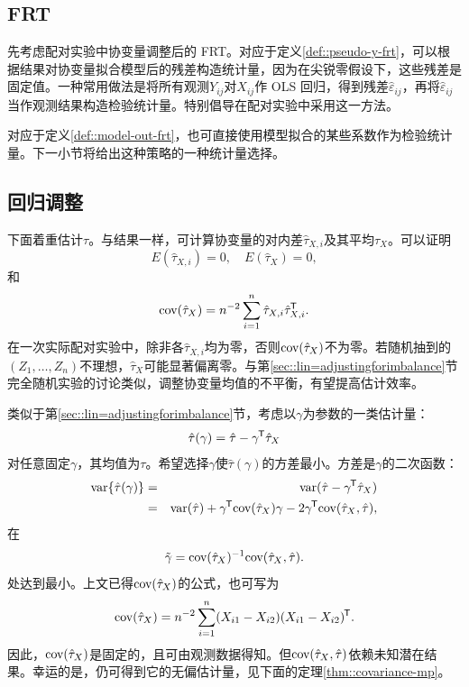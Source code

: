 \subsection{FRT}

 
先考虑配对实验中协变量调整后的 FRT。对应于定义\ref{def::pseudo-y-frt}，可以根据结果对协变量拟合模型后的残差构造统计量，因为在尖锐零假设下，这些残差是固定值。一种常用做法是将所有观测$Y_{ij}$对$X_{ij}$作 OLS 回归，得到残差$\hat \varepsilon_{ij}$，再将$\hat \varepsilon_{ij}$当作观测结果构造检验统计量。\citet{rosenbaum2002covariance}特别倡导在配对实验中采用这一方法。 


对应于定义\ref{def::model-out-frt}，也可直接使用模型拟合的某些系数作为检验统计量。下一小节将给出这种策略的一种统计量选择。 



\subsection{回归调整}


下面着重估计$\tau$。与结果一样，可计算协变量的对内差$\hat{\tau}_{X,i} $及其平均$\hat{\tau}_X $。可以证明
$$
 E(\hat{\tau}_{X,i}   ) = 0,\quad 
 E(\hat{\tau}_X ) = 0,
 $$
和
$$
\textup{cov}(\hat{\tau}_X   ) =n^{-2} \sum_{i=1}^n \hat{\tau}_{X,i}   \hat{\tau}_{X,i}  ^{\mkern-1.5mu\mathsf{T}} .
$$
在一次实际配对实验中，除非各$\hat{\tau}_{X,i}  $均为零，否则$\textup{cov}(\hat{\tau}_X   ) $不为零。若随机抽到的$(Z_1,\ldots, Z_n)$不理想，$\hat{\tau}_X $可能显著偏离零。与第\ref{sec::lin=adjustingforimbalance}节完全随机实验的讨论类似，调整协变量均值的不平衡，有望提高估计效率。 

类似于第\ref{sec::lin=adjustingforimbalance}节，考虑以$\gamma$为参数的一类估计量：
$$
\hat{\tau}(\gamma) = \hat{\tau} - \gamma^{\mkern-1.5mu\mathsf{T}} \hat{\tau}_X 
$$
对任意固定$\gamma$，其均值为$\tau$。希望选择$\gamma$使$\hat{\tau}(\gamma)$的方差最小。方差是$\gamma$的二次函数：
\begin{eqnarray*}
\textup{var}\{ \hat{\tau}(\gamma) \} &=&   \textup{var}(\hat{\tau} - \gamma^{\mkern-1.5mu\mathsf{T}} \hat{\tau}_X ) \\
&=&  \textup{var}(\hat{\tau}  ) + \gamma^{\mkern-1.5mu\mathsf{T}} \textup{cov}(\hat{\tau}_X   ) \gamma - 2\gamma^{\mkern-1.5mu\mathsf{T}} \textup{cov}( \hat{\tau}_X ,  \hat{\tau}  ),
\end{eqnarray*}
在
$$
\tilde{\gamma} = \textup{cov}(\hat{\tau}_X   )^{-1}  \textup{cov}( \hat{\tau}_X ,  \hat{\tau}  ).
$$
处达到最小。上文已得$\textup{cov}(\hat{\tau}_X   ) $的公式，也可写为
$$
\textup{cov}(\hat{\tau}_X) = n^{-2} \sum_{i=1}^n (X_{i1}-X_{i2})(X_{i1}-X_{i2})^{\mkern-1.5mu\mathsf{T}}.
$$
因此，$\textup{cov}(\hat{\tau}_X)$是固定的，且可由观测数据得知。但$\textup{cov}( \hat{\tau}_X ,  \hat{\tau}  )$依赖未知潜在结果。幸运的是，仍可得到它的无偏估计量，见下面的定理\ref{thm::covariance-mp}。


